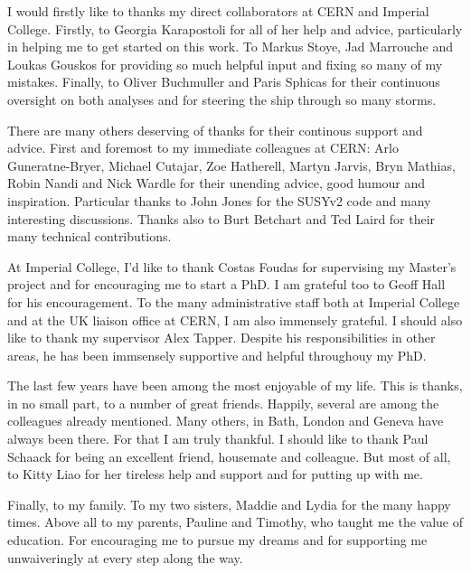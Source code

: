 \begin{acknowledgements}
  I would firstly like to thanks my direct collaborators at \ac{CERN} and
  Imperial College. Firstly, to Georgia Karapostoli for all of her help and
  advice, particularly in helping me to get started on this work. To Markus
  Stoye, Jad Marrouche and Loukas Gouskos for providing so much helpful input
  and fixing so many of my mistakes. Finally, to Oliver Buchmuller and Paris
  Sphicas for their continuous oversight on both analyses and for steering the
  ship through so many storms.

  There are many others deserving of thanks for their continous support and
  advice. First and foremost to my immediate colleagues at \ac{CERN}: Arlo
  Guneratne-Bryer, Michael Cutajar, Zoe Hatherell, Martyn Jarvis, Bryn Mathias,
  Robin Nandi and Nick Wardle for their unending advice, good humour and
  inspiration. Particular thanks to John Jones for the \ac{SUSYv2} code and many
  interesting discussions. Thanks also to Burt Betchart and Ted Laird for their
  many technical contributions.

  At Imperial College, I'd like to thank Costas Foudas for supervising my
  Master's project and for encouraging me to start a PhD. I am grateful too to
  Geoff Hall for his encouragement. To the many administrative staff both at
  Imperial College and at the UK liaison office at CERN, I am also immensely
  grateful. I should also like to thank my supervisor Alex Tapper. Despite his
  responsibilities in other areas, he has been immsensely supportive and helpful
  throughouy my PhD.

  The last few years have been among the most enjoyable of my life. This is
  thanks, in no small part, to a number of great friends. Happily, several are
  among the colleagues already mentioned. Many others, in Bath, London and
  Geneva have always been there. For that I am truly thankful. I should like to
  thank Paul Schaack for being an excellent friend, housemate and colleague. But
  most of all, to Kitty Liao for her tireless help and support and for putting
  up with me.

  Finally, to my family.  To my two sisters, Maddie and Lydia for the many happy
  times. Above all to my parents, Pauline and Timothy, who taught me the value
  of education. For encouraging me to pursue my dreams and for supporting me
  unwaiveringly at every step along the way.
\end{acknowledgements}


